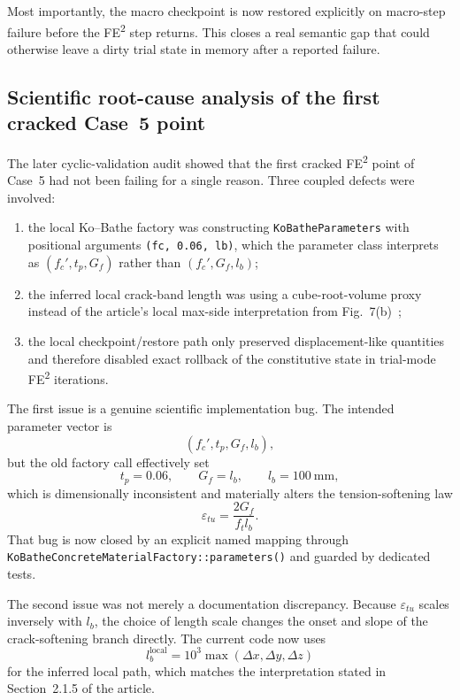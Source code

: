 Most importantly, the macro checkpoint is now restored explicitly on macro-step
failure before the FE\textsuperscript{2} step returns.  This closes a real
semantic gap that could otherwise leave a dirty trial state in memory after a
reported failure.

\subsection{Scientific root-cause analysis of the first cracked Case~5 point}
\label{sec:ms-stab-case5-root-cause}

The later cyclic-validation audit showed that the first cracked
FE\textsuperscript{2} point of Case~5 had not been failing for a single
reason.  Three coupled defects were involved:
\begin{enumerate}
  \item the local Ko--Bathe factory was constructing
    \texttt{KoBatheParameters} with positional arguments
    \texttt{(fc, 0.06, lb)}, which the parameter class interprets as
    \((f_c', t_p, G_f)\) rather than \((f_c', G_f, l_b)\);
  \item the inferred local crack-band length was using a cube-root-volume
    proxy instead of the article's local max-side interpretation from
    Fig.~7(b)~\cite{KoBathe2026};
  \item the local checkpoint/restore path only preserved displacement-like
    quantities and therefore disabled exact rollback of the constitutive state
    in trial-mode FE\textsuperscript{2} iterations.
\end{enumerate}

The first issue is a genuine scientific implementation bug.  The intended
parameter vector is
\begin{equation}
  (f_c', t_p, G_f, l_b),
\end{equation}
but the old factory call effectively set
\begin{equation}
  t_p = 0.06,
  \qquad
  G_f = l_b,
  \qquad
  l_b = 100~\text{mm},
\end{equation}
which is dimensionally inconsistent and materially alters the tension-softening
law
\begin{equation}
  \varepsilon_{tu} = \frac{2G_f}{f_t l_b}.
\end{equation}
That bug is now closed by an explicit named mapping through
\texttt{KoBatheConcreteMaterialFactory::parameters()} and guarded by dedicated
tests.

The second issue was not merely a documentation discrepancy.  Because
\(\varepsilon_{tu}\) scales inversely with \(l_b\), the choice of length scale
changes the onset and slope of the crack-softening branch directly.  The
current code now uses
\begin{equation}
  l_b^{\mathrm{local}}
  =
  10^3 \max(\Delta x,\Delta y,\Delta z)
\end{equation}
for the inferred local path, which matches the interpretation stated in
Section~2.1.5 of the article.

